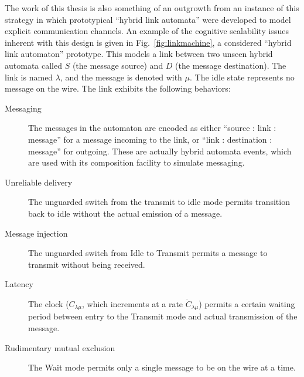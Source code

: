 The work of this thesis is also something of an outgrowth from an instance of 
this strategy in which prototypical ``hybrid link automata'' were developed to 
model explicit communication channels. An example of the cognitive scalability 
issues inherent with this design is given in Fig.~\ref{fig:linkmachine},
a considered ``hybrid link automaton'' prototype. This models a link between two
unseen hybrid automata called $S$ (the message source) and $D$ (the message
destination). The link is named $\lambda$, and the message is denoted with 
$\mu$. The idle state represents no message on the wire.
The link exhibits the following behaviors:

\begin{description}
\item[Messaging] The messages in the automaton are encoded as either
    ``source : link : message'' for a message incoming to the link, or
    ``link : destination : message'' for outgoing. These are actually hybrid
    automata events, which are used with its composition facility to simulate
    messaging.
\item[Unreliable delivery] The unguarded switch from the transmit to idle mode
    permits transition back to idle without the actual emission of a message.
\item[Message injection] The unguarded switch from Idle to Transmit permits a
    message to transmit without being received.
\item[Latency] The clock ($C_{\lambda\mu}$, which increments at a rate 
    $\dot{C}_{\lambda\mu}$) permits a certain waiting period between entry to
    the Transmit mode and actual transmission of the message.
\item[Rudimentary mutual exclusion] The Wait mode permits only a single
    message to be on the wire at a time.
\end{description}


